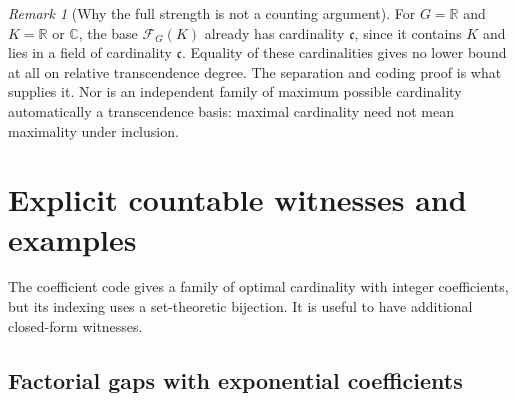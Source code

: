 \documentclass[11pt,letterpaper]{article}
\theoremstyle{definition}
\theoremstyle{remark}
\newtheorem{remark}[theorem]{Remark}
\newcommand{\R}{\mathbb R}
\newcommand{\C}{\mathbb C}
\newcommand{\FF}[2]{\mathcal F_{#2}(#1)}
\newcommand{\cc}{\mathfrak c}
\begin{document}
\begin{remark}[Why the full strength is not a counting argument]
For $G=\R$ and $K=\R$ or $\C$, the base $\FF KG$ already has cardinality
$\cc$, since it contains $K$ and lies in a field of cardinality $\cc$.
Equality of these cardinalities gives no lower bound at all on relative
transcendence degree. The separation and coding proof is what supplies it.
Nor is an independent family of maximum possible cardinality automatically
a transcendence basis: maximal cardinality need not mean maximality under
inclusion.
\end{remark}

\section{Explicit countable witnesses and examples}\label{bst:sec:examples}

The coefficient code gives a family of optimal cardinality with integer
coefficients, but its indexing uses a set-theoretic bijection. It is useful
to have additional closed-form witnesses.

\subsection{Factorial gaps with exponential coefficients}
\end{document}
